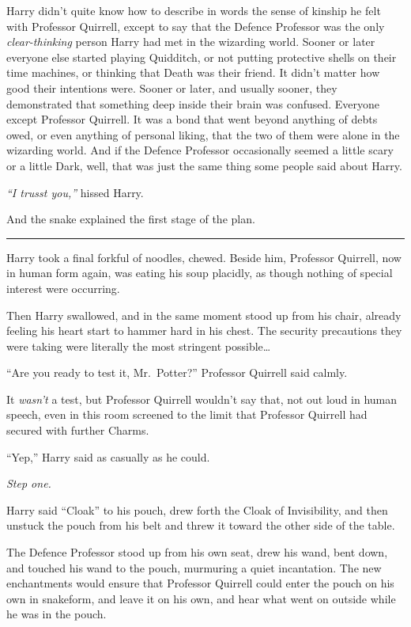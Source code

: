 Harry didn't quite know how to describe in words the sense of kinship he
felt with Professor Quirrell, except to say that the Defence Professor
was the only \emph{clear-thinking} person Harry had met in the wizarding
world. Sooner or later everyone else started playing Quidditch, or not
putting protective shells on their time machines, or thinking that Death
was their friend. It didn't matter how good their intentions were.
Sooner or later, and usually sooner, they demonstrated that something
deep inside their brain was confused. Everyone except Professor
Quirrell. It was a bond that went beyond anything of debts owed, or even
anything of personal liking, that the two of them were alone in the
wizarding world. And if the Defence Professor occasionally seemed a
little scary or a little Dark, well, that was just the same thing some
people said about Harry.

\emph{``I trusst you,''} hissed Harry.

And the snake explained the first stage of the plan.

\begin{center}\rule{3in}{0.4pt}\end{center}

Harry took a final forkful of noodles, chewed. Beside him, Professor
Quirrell, now in human form again, was eating his soup placidly, as
though nothing of special interest were occurring.

Then Harry swallowed, and in the same moment stood up from his chair,
already feeling his heart start to hammer hard in his chest. The
security precautions they were taking were literally the most stringent
possible\ldots{}

``Are you ready to test it, Mr.~Potter?'' Professor Quirrell said
calmly.

It \emph{wasn't} a test, but Professor Quirrell wouldn't say that, not
out loud in human speech, even in this room screened to the limit that
Professor Quirrell had secured with further Charms.

``Yep,'' Harry said as casually as he could.

\emph{Step one.}

Harry said ``Cloak'' to his pouch, drew forth the Cloak of Invisibility,
and then unstuck the pouch from his belt and threw it toward the other
side of the table.

The Defence Professor stood up from his own seat, drew his wand, bent
down, and touched his wand to the pouch, murmuring a quiet incantation.
The new enchantments would ensure that Professor Quirrell could enter
the pouch on his own in snakeform, and leave it on his own, and hear
what went on outside while he was in the pouch.

